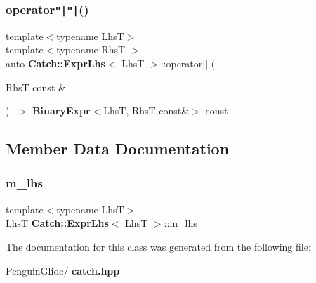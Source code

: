 \mbox{\label{class_catch_1_1_expr_lhs_ae9b4ee923b90af22c9e39261c2f03cd3}} 
\subsubsection{operator\texttt{"|}\texttt{"|}()}
{\footnotesize\ttfamily template$<$typename LhsT$>$ \\
template$<$typename RhsT $>$ \\
auto \textbf{ Catch\+::\+Expr\+Lhs}$<$ LhsT $>$\+::operator$\vert$$\vert$ (\begin{DoxyParamCaption}\item[{RhsT const \&}]{ }\end{DoxyParamCaption}) -\/$>$ \textbf{ Binary\+Expr}$<$LhsT, RhsT const\&$>$ const \hspace{0.3cm}{\ttfamily [inline]}}



\subsection{Member Data Documentation}
\mbox{\label{class_catch_1_1_expr_lhs_af290873a8427ccbdae6acb915fb7366a}} 
\subsubsection{m\_lhs}
{\footnotesize\ttfamily template$<$typename LhsT$>$ \\
LhsT \textbf{ Catch\+::\+Expr\+Lhs}$<$ LhsT $>$\+::m\+\_\+lhs\hspace{0.3cm}{\ttfamily [private]}}



The documentation for this class was generated from the following file\+:\begin{DoxyCompactItemize}
\item 
Penguin\+Glide/\textbf{ catch.\+hpp}\end{DoxyCompactItemize}

